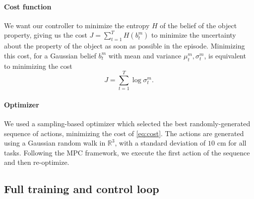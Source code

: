 \documentclass[anon]{l4dc2024}
\begin{document}
\paragraph{Cost function}
We want our controller to minimize the entropy $H$ of the belief of the object property, giving us the cost
$%
    J = \sum_{t=1}^T H(b_t^m)
$
to minimize the uncertainty about the property of the object as soon as possible in the episode.
Minimizing this cost, for a Gaussian belief $b_t^m$ with mean and variance $\mu_t^m, \sigma_t^m$, is equivalent to minimizing the cost
\begin{equation}
    \label{eq:cost}
    J = \sum_{t=1}^T \log \sigma_t^m.
\end{equation}

\paragraph{Optimizer}
We used a sampling-based optimizer which selected the best randomly-generated sequence of actions, minimizing the cost of \autoref{eq:cost}.
The actions are generated using a Gaussian random walk in $\mathbb{R}^3$, with a standard deviation of $10$ cm for all tasks.
Following the \ac{MPC} framework, we execute the first action of the sequence and then re-optimize.



\subsection{Full training and control loop}
\label{sec:loop}
\end{document}
